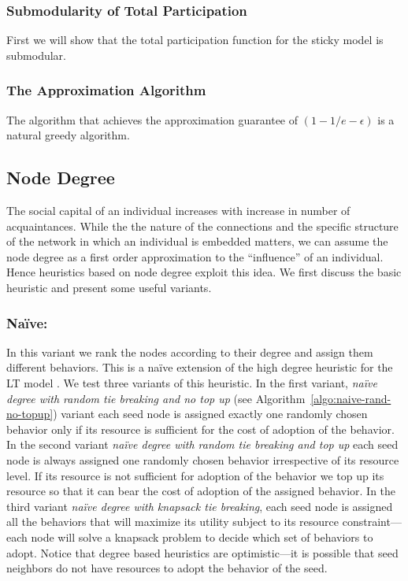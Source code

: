 \documentclass[letterpaper]{article}
\theoremstyle{plain} 		\newtheorem{thm}{Theorem}[section]
\theoremstyle{definition} 	\newtheorem{defn}[thm]{Definition}
\theoremstyle{remark}		\newtheorem{rem}{Remark}
\begin{document}
\subsubsection{Submodularity of Total Participation}
First we will show that the total participation function for the sticky model is submodular.

\subsubsection{The Approximation Algorithm}
The algorithm that achieves the approximation guarantee of $(1-1/e-\epsilon)$ is a natural greedy algorithm.

\subsection{Node Degree}
The social capital of an individual increases with increase in number of acquaintances. While the the nature of the connections and the specific structure of the network in which an individual is embedded matters, we can assume the node degree as a first order approximation to the ``influence'' of an individual. Hence heuristics based on node degree exploit this idea. We first discuss the basic heuristic and present some useful variants.

\subsubsection{Na\"ive:} In this variant we rank the nodes according to their degree and assign them different behaviors. This is a na\"ive extension of the high degree heuristic for the LT model \cite{Kempe03}. We test three variants of this heuristic. In the first variant, \textit{na\"ive degree with random tie breaking and no top up} (see Algorithm~\ref{algo:naive-rand-no-topup}) variant each seed node is assigned exactly one randomly chosen behavior only if its resource is sufficient for the cost of adoption of the behavior. In the second variant \textit{na\"ive degree with random tie breaking and top up}  each seed node is always assigned one randomly chosen behavior irrespective of its resource level. If its resource is not sufficient for adoption of the behavior we top up its resource so that it can bear the cost of adoption of the assigned behavior. In the third variant \textit{na\"ive degree with knapsack tie breaking}, each seed node is assigned all the behaviors that will maximize its utility subject to its resource constraint---each node will solve a knapsack problem to decide which set of behaviors to adopt. Notice that degree based heuristics are optimistic---it is possible that seed neighbors do not have resources to adopt the behavior of the seed.
\end{document}

